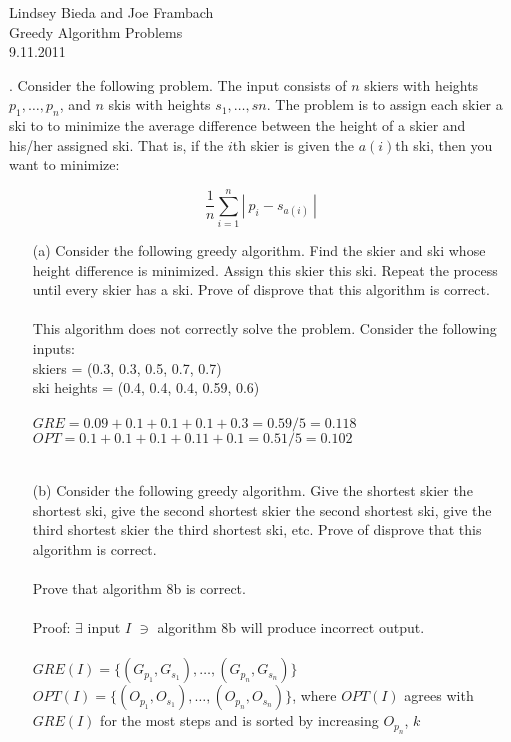 \documentclass[10pt]{article}
\begin{document}
	\begin{flushright}
	Lindsey Bieda and Joe Frambach\\
	Greedy Algorithm Problems\\
	9.11.2011
	\end{flushright}
	. Consider the following problem.  The input consists of $n$ skiers with heights $p_{1}, \ldots, p_{n}$, and $n$ skis
	with heights $s_{1}, \ldots, s{n}$. The problem is to assign each skier a ski to to minimize the average difference
	between the height of a skier and his/her assigned ski. That is, if the $i$th skier is given the $a(i)$th ski,
	then you want to minimize:
	
	\[ \frac{1}{n}\sum\limits_{i=1}^n|~p_{i} - s_{a(i)}~|\]
	\begin{enumerate}
		\item[(a)] Consider the following greedy algorithm. Find the skier and ski whose height difference is minimized. 
		Assign this skier this ski. Repeat the process until every skier has a ski. Prove of disprove
		that this algorithm is correct.\\
		\\
		This algorithm does not correctly solve the problem. Consider the following inputs:\\
		skiers = (0.3, 0.3, 0.5, 0.7, 0.7)\\
		ski heights = (0.4, 0.4, 0.4, 0.59, 0.6)\\
		\\
		$GRE = 0.09 + 0.1 + 0.1 + 0.1 + 0.3 = 0.59/5 = 0.118$\\
		$OPT = 0.1 + 0.1 + 0.1 + 0.11 + 0.1 =  0.51/5 = 0.102$\\
		\\
		\item[(b)] Consider the following greedy algorithm. Give the shortest skier the shortest ski, give the second
		shortest skier the second shortest ski, give the third shortest skier the third shortest ski, etc.
		Prove of disprove that this algorithm is correct.\\
		\\
		Prove that algorithm 8b is correct.\\
		\\
		Proof: $\exists$ input $I$ $\ni$ algorithm 8b will produce incorrect output.\\
		\\
		$GRE(I) = \{(G_{p_{1}}, G_{s_{1}}), \ldots, (G_{p_{n}},G_{s_{n}})\}$\\
		$OPT(I) = \{(O_{p_{1}}, O_{s_{1}}), \ldots, (O_{p_{n}},O_{s_{n}})\}$, where $OPT(I)$ agrees with $GRE(I)$ for the most steps and is sorted by increasing $O_{p_{n}}$, $k$\\

\end{enumerate}
\end{document}
